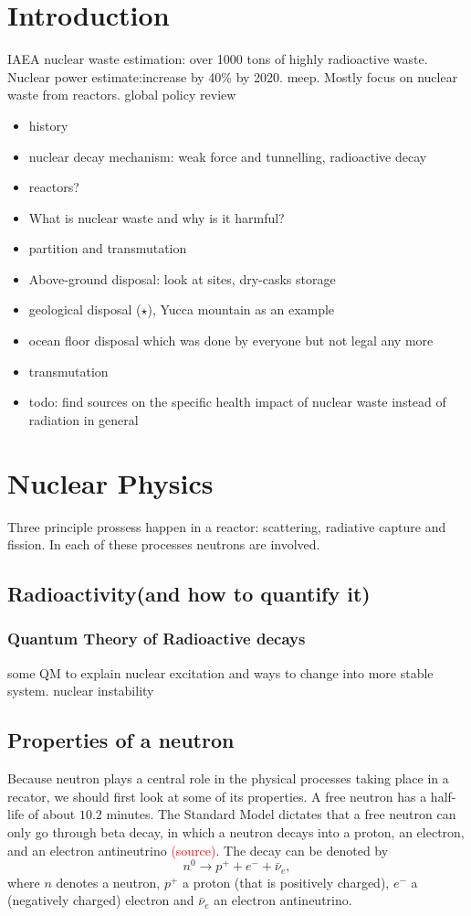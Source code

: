 \documentclass[preprint,aip,cha]{revtex4-1}
\newcommand{\red}[1]{\textcolor{red}{#1}}
\begin{document}
\section{Introduction}
IAEA nuclear waste estimation: over 1000 tons of highly radioactive waste.\cite{iaea08}
Nuclear power estimate:increase by 40\% by 2020. \cite{iaea12}
meep. Mostly focus on nuclear waste from reactors.
global policy review \cite{r12} 
\begin{itemize}
    \item history
    \item nuclear decay mechanism: weak force and tunnelling, radioactive decay
    \item reactors?
    \item What is nuclear waste and why is it harmful?
    \item partition and transmutation
    \item Above-ground disposal: look at sites, dry-casks storage
    \item geological disposal ($\star$), Yucca mountain as an example
    \item ocean floor disposal which was done by everyone but not legal any more
    \item transmutation
    \item todo: find sources on the specific health impact of nuclear waste instead of radiation
        in general
\end{itemize}

\section{Nuclear Physics}
    Three principle prossess happen in a reactor: scattering, radiative capture and fission.
    In each of these processes neutrons are involved.
    \subsection{Radioactivity(and how to quantify it)}
        \subsubsection{Quantum Theory of Radioactive decays}
        some QM to explain nuclear excitation and ways to change into more stable system.
        nuclear instability
    \subsection{Properties of a neutron}
        Because neutron plays a central role in the physical processes taking
        place in a recator, we should first look at some of its
        properties. A free neutron has a half-life of about $10.2$ minutes. \cite{gc01} The Standard
        Model dictates that a free neutron can only go through beta decay, in which a neutron decays
        into a proton, an electron, and an electron antineutrino \red{(source)}. The decay can be denoted by
        \[n^0 \rightarrow p^+ + e^- + \bar{\nu}_e,\]
        where $n$ denotes a neutron, $p^+$ a proton (that is positively charged), $e^-$ a
        (negatively charged) electron and $\bar{\nu}_e$ an electron antineutrino.
\end{document}
